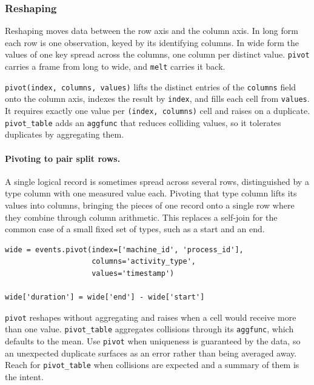 \subsubsection{Reshaping}

Reshaping moves data between the row axis and the column axis. In long form each row is one observation, keyed by its identifying columns. In wide form the values of one key spread across the columns, one column per distinct value. \texttt{pivot} carries a frame from long to wide, and \texttt{melt} carries it back.

\vspace{1ex}

\begin{definition}
\texttt{pivot(index, columns, values)} lifts the distinct entries of the \texttt{columns} field onto the column axis, indexes the result by \texttt{index}, and fills each cell from \texttt{values}. It requires exactly one value per \texttt{(index, columns)} cell and raises on a duplicate. \texttt{pivot\_table} adds an \texttt{aggfunc} that reduces colliding values, so it tolerates duplicates by aggregating them.
\end{definition}

\paragraph{Pivoting to pair split rows.} A single logical record is sometimes spread across several rows, distinguished by a type column with one measured value each. Pivoting that type column lifts its values into columns, bringing the pieces of one record onto a single row where they combine through column arithmetic. This replaces a self-join for the common case of a small fixed set of types, such as a start and an end.

\begin{lstlisting}[style=python, caption={Pivot a start/end type column into aligned columns}]
wide = events.pivot(index=['machine_id', 'process_id'],
                    columns='activity_type',
                    values='timestamp')

wide['duration'] = wide['end'] - wide['start']
\end{lstlisting}

\begin{keybox}
\texttt{pivot} reshapes without aggregating and raises when a cell would receive more than one value. \texttt{pivot\_table} aggregates collisions through its \texttt{aggfunc}, which defaults to the mean. Use \texttt{pivot} when uniqueness is guaranteed by the data, so an unexpected duplicate surfaces as an error rather than being averaged away. Reach for \texttt{pivot\_table} when collisions are expected and a summary of them is the intent.
\end{keybox}

